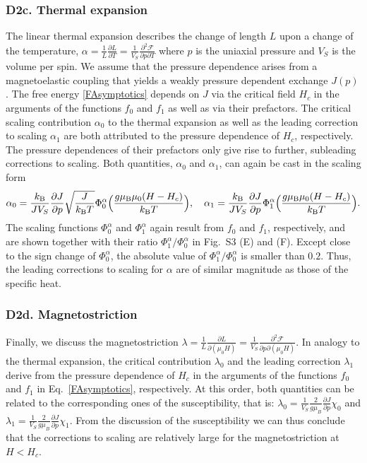 \documentclass[12pt]{article}
\begin{document}
\subsubsection*{D2c. Thermal expansion}

The linear thermal expansion describes the change of length $L$ upon a change of the temperature, $\alpha = \frac{1}{L}\frac{\partial L}{\partial T} = \frac{1}{V_S} \frac{\partial^2 \mathcal{F}}{\partial p\partial T}$ where $p$ is the uniaxial pressure and $V_S$ is the volume per spin. We assume that the pressure dependence arises from a magnetoelastic coupling that yields a weakly pressure dependent exchange $J(p)$. The free energy \eqref{FAsymptotics} depends on $J$ via the critical field $H_c$ in the arguments of the functions $f_0$ and $f_1$ as well as via their prefactors. 
The critical scaling contribution $\alpha_0$ to the thermal expansion as well as the leading correction to scaling $\alpha_1$ are both attributed to the pressure dependence of $H_c$, respectively. The pressure dependences of their prefactors only give rise to further, subleading corrections to scaling. Both quantities, $\alpha_0$ and $\alpha_1$, can again be cast in the scaling form
%
\begin{align}
\alpha_0 = \frac{k_{\rm B}}{J V_S} \frac{\partial J}{\partial p} 
\sqrt{\frac{J}{k_{\rm B} T}} \Phi_0^\alpha \Big(\frac{g\mu_{\rm B} \mu_0 (H-H_c)}{k_{\rm B} T}\Big),\quad
\alpha_1 = \frac{k_{\rm B}}{J V_S} \frac{\partial J}{\partial p} 
\Phi_1^\alpha \Big(\frac{g\mu_{\rm B} \mu_0 (H-H_c)}{k_{\rm B} T}\Big).
\end{align}
%
The scaling functions $\Phi_0^\alpha$ and $\Phi_1^\alpha$ again result from $f_0$ and $f_1$, respectively, and are shown together with their ratio $\Phi_1^\alpha/\Phi_0^\alpha$ in Fig.~{S3} (E) and (F). Except close to the sign change of $\Phi_0^\alpha$, the absolute value of $\Phi_1^\alpha/\Phi_0^\alpha$ is smaller than $0.2$. Thus, the leading corrections to scaling for $\alpha$ are of similar magnitude as those of the specific heat. 

	
	

\subsubsection*{D2d. Magnetostriction}

Finally, we discuss the magnetostriction  $\lambda = \frac{1}{L}\frac{\partial L}{\partial (\mu_0 H)} = \frac{1}{V_S} \frac{\partial^2 \mathcal{F}}{\partial p\partial (\mu_0 H)}$. In analogy to the thermal expansion, the critical contribution $\lambda_0$ and the leading correction $\lambda_1$ derive from the pressure dependence of $H_c$ in the arguments of the functions $f_0$ and $f_1$ in Eq.~\eqref{FAsymptotics}, respectively. At this order, both quantities can be related to the corresponding ones of the susceptibility, that is: $\lambda_0 = \frac{1}{V_S} \frac{2}{g\mu_B}\frac{\partial J}{\partial p} \chi_0$ and $\lambda_1 = \frac{1}{V_S} \frac{2}{g\mu_B}\frac{\partial J}{\partial p} \chi_1$. From the discussion of the susceptibility we can thus conclude that the corrections to scaling are relatively large for the magnetostriction at $H < H_{c}$.
 
 
\end{document}
